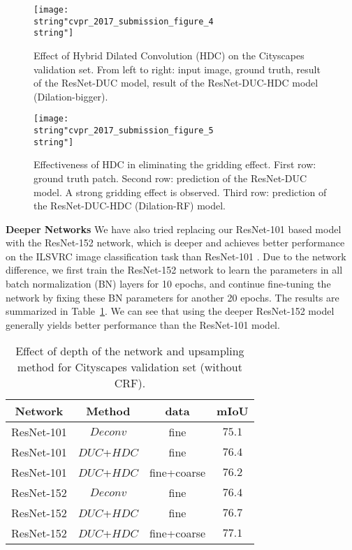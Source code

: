 \documentclass[10pt,twocolumn,letterpaper]{article}
\begin{document}
\begin{figure*}[h]
\begin{center}
\texttt{[image: \\string"cvpr\_2017\_submission\_figure\_4\\string"]}
\end{center}
\caption{Effect of Hybrid Dilated Convolution (HDC) on the Cityscapes validation set. From left to right: input image, ground truth, result of the ResNet-DUC model, result of the ResNet-DUC-HDC model (Dilation-bigger).}
\label{cvpr_2017_submission_figure_4}
\vspace{-15pt}
\end{figure*}

\begin{figure}[h]
\begin{center}
\texttt{[image: \\string"cvpr\_2017\_submission\_figure\_5\\string"]}
\end{center}
\caption{Effectiveness of HDC in eliminating the gridding effect. First row: ground truth patch. Second row: prediction of the ResNet-DUC model. A strong gridding effect is observed. Third row: prediction of the ResNet-DUC-HDC (Dilation-RF) model.}
\label{Figure5_gridding_example_result}
\vspace{-10pt}
\end{figure}

\textbf{Deeper Networks}
We have also tried replacing our ResNet-101 based model with the ResNet-152 network, which is deeper and achieves better performance on the ILSVRC image classification task than ResNet-101 \cite{he2015deep}. Due to the network difference, we first train the ResNet-152 network to learn the parameters in all batch normalization (BN) layers for 10 epochs, and continue fine-tuning the network by fixing these BN parameters for another 20 epochs. The results are summarized in Table~\ref{table_3}. We can see that using the deeper ResNet-152 model generally yields better performance than the ResNet-101 model.
\begin{table}[ht]
\begin{center}
\begin{tabular}{ccc|c} \toprule[1.5pt]{Network}      &     {Method} & {data}  &{mIoU}\\ \midrule
   ResNet-101  &     $Deconv$  & {fine}  & $75.1$\\
   ResNet-101  &     $DUC$+$HDC$ & {fine}   & $76.4$\\   
   ResNet-101  &     $DUC$+$HDC$  & {fine+coarse}  & $76.2$ \\\midrule
   ResNet-152  &     	 $Deconv$  & {fine}  & $76.4$ \\
   ResNet-152  &     	 $DUC$+$HDC$  & {fine}  & $76.7$\\
   ResNet-152  &     	 $DUC$+$HDC$  & {fine+coarse}  & $77.1$ \\
\bottomrule[1.5pt]
\end{tabular}
\vspace{2pt}
\caption{Effect of depth of the network and upsampling method for Cityscapes validation set (without CRF).}
\label{table_3} 
\end{center}
\vspace{-25pt}
\end{table}
\end{document}

